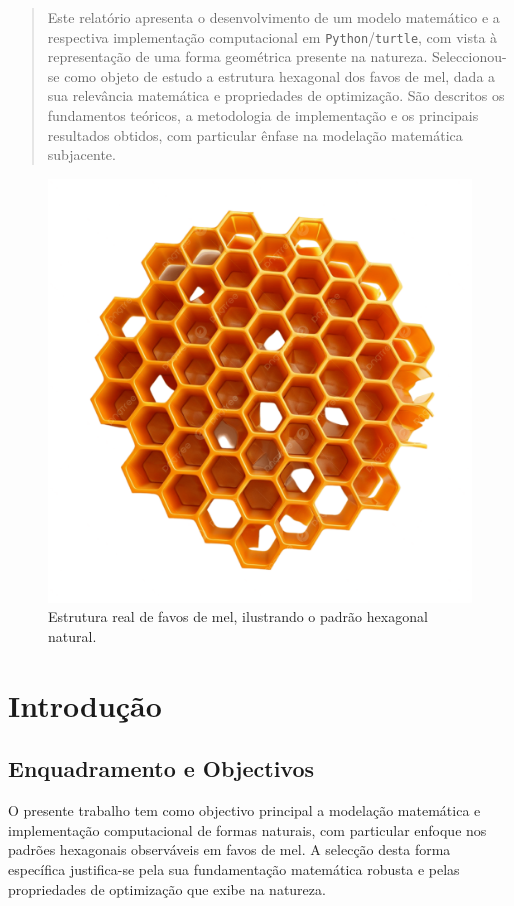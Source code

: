 \documentclass[12pt,a4paper,oneside]{extarticle}
\begin{document}

\begin{abstract}
Este relatório apresenta o desenvolvimento de um modelo matemático e a respectiva implementação computacional em \texttt{Python}/\texttt{turtle}, com vista à representação de uma forma geométrica presente na natureza. Seleccionou-se como objeto de estudo a estrutura hexagonal dos favos de mel, dada a sua relevância matemática e propriedades de optimização. São descritos os fundamentos teóricos, a metodologia de implementação e os principais resultados obtidos, com particular ênfase na modelação matemática subjacente.
\end{abstract}

\begin{figure}[h!]
\centering
\includegraphics[width=0.8\linewidth]{real.png}
\caption{Estrutura real de favos de mel, ilustrando o padrão hexagonal natural.}
\label{fig:real}
\end{figure}


\section{Introdução}

\subsection{Enquadramento e Objectivos}
O presente trabalho tem como objectivo principal a modelação matemática e implementação computacional de formas naturais, com particular enfoque nos padrões hexagonais observáveis em favos de mel. A selecção desta forma específica justifica-se pela sua fundamentação matemática robusta e pelas propriedades de optimização que exibe na natureza.
\end{document}
